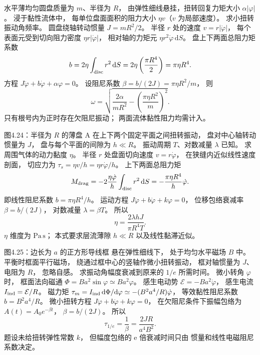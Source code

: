 水平薄均匀圆盘质量为 $m$、半径为 $R$，
由弹性细线悬挂，扭转回复力矩大小
$\alpha|\varphi|$。
浸于黏性流体中，
每单位盘面面积的阻力大小
$\eta v$（$v$ 为局部速度）。
求小扭转振动角频率。
\exsolution
圆盘绕轴转动惯量
$J=mR^2/2$。
半径 $r$ 处的速度
$v=r|\dot\varphi|$，
每个表面元受到切向阻力密度
$\eta r|\dot\varphi|$，
相对轴的力矩元
$\eta r^2\dot\varphi\,\mathrm dS$。
盘上下两面总阻力矩系数
\[
b=2\eta\int_{\rm disc}r^2\,\mathrm dS
=2\eta\left(\frac{\pi R^4}{2}\right)
=\pi\eta R^4.
\]
方程
$J\ddot\varphi+b\dot\varphi+\alpha\varphi=0$。
设阻尼系数
$\beta=b/(2J)=\pi\eta R^2/m$，
则
\[
\boxed{\omega=
\sqrt{\frac{2\alpha}{mR^2}-
\left(\frac{\pi\eta R^2}{m}\right)^2}}.
\]
\excheck 只有根号内为正时存在欠阻尼振动；
两面流体黏性阻力均需计入。

图4.24：半径为 $R$ 的薄盘 A
在上下两个固定平面之间扭转振动，
盘对中心轴转动惯量为 $J$，
盘与每个平面的间隙为
$h\ll R$。
振动周期 $T$、对数减量 $\lambda$ 已知。
求周围气体的动力黏度 $\eta$。
\exsolution
半径 $r$ 处盘面切向速度
$v=r\dot\varphi$，
在狭缝内近似线性速度剖面，
切应力为
$\tau_s=\eta v/h=\eta r\dot\varphi/h$。
上下两面总阻力矩
\[
M_{\rm drag}=-2\frac{\eta\dot\varphi}{h}
\int_{\rm disc}r^2\,\mathrm dS
=-\frac{\pi\eta R^4}{h}\dot\varphi.
\]
即线性阻尼系数
$b=\pi\eta R^4/h$。
运动方程
$J\ddot\varphi+b\dot\varphi+k\varphi=0$，
位移包络衰减率
$\beta=b/(2J)$，
对数减量 $\lambda=\beta T$。
所以
\[
\boxed{\eta=\frac{2\lambda hJ}{\pi R^4T}}.
\]
\excheck $\eta$ 维度为
$\mathrm{Pa\,s}$；
本式要求层流薄隙 $h\ll R$ 以及线性黏滞近似。

图4.25：边长为 $a$ 的正方形导线框
悬在弹性细线下，
处于均匀水平磁场 $B$ 中。
平衡时框面平行磁场，
绕通过框中心的竖轴作微小扭转振动，
框对轴惯量为 $J$、电阻为 $R$，
忽略自感。
求振动角幅度衰减到原来的
$1/e$ 所需时间。
\exsolution
微小转角 $\varphi$ 时，
框面法向磁通
$\Phi=Ba^2\sin\varphi
\simeq Ba^2\varphi$。
感生电动势
$\mathcal E=-Ba^2\dot\varphi$，
感生电流
$I_{\rm ind}=\mathcal E/R$。
磁力矩
$\tau_m=I_{\rm ind}\,\mathrm d\Phi/\mathrm d\varphi
\simeq-(B^2a^4/R)\dot\varphi$，
等效黏性阻尼系数
$b=B^2a^4/R$。
微小扭转方程
$J\ddot\varphi+b\dot\varphi+k\varphi=0$，
在欠阻尼条件下振幅包络为
$A(t)=A_0e^{-\beta t}$，
$\beta=b/(2J)$。
所以
\[
\boxed{\tau_{1/e}=\frac1\beta
=\frac{2JR}{a^4B^2}}.
\]
\excheck 题设未给扭转弹性常数 $k$，
但幅度包络的 e 倍衰减时间只由
惯量和线性电磁阻尼系数决定。
